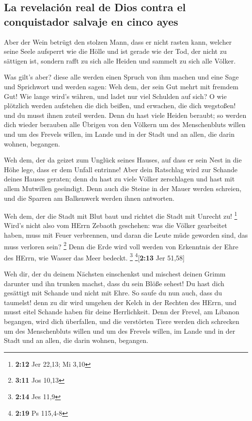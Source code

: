 \hypertarget{la-revelaciuxf3n-real-de-dios-contra-el-conquistador-salvaje-en-cinco-ayes}{%
\subsection{La revelación real de Dios contra el conquistador salvaje en
cinco
ayes}\label{la-revelaciuxf3n-real-de-dios-contra-el-conquistador-salvaje-en-cinco-ayes}}

 Aber der Wein betrügt den stolzen Mann, dass er nicht
rasten kann, welcher seine Seele aufsperrt wie die Hölle und ist gerade
wie der Tod, der nicht zu sättigen ist, sondern rafft zu sich alle
Heiden und sammelt zu sich alle Völker.

 Was gilt's aber? diese alle werden einen Spruch von ihm
machen und eine Sage und Sprichwort und werden sagen: Weh dem, der sein
Gut mehrt mit fremdem Gut! Wie lange wird's währen, und ladet nur viel
Schulden auf sich?  O wie plötzlich werden aufstehen die
dich beißen, und erwachen, die dich wegstoßen! und du musst ihnen zuteil
werden.  Denn du hast viele Heiden beraubt; so werden dich
wieder berauben alle Übrigen von den Völkern um des Menschenbluts willen
und um des Frevels willen, im Lande und in der Stadt und an allen, die
darin wohnen, begangen.

 Weh dem, der da geizet zum Unglück seines Hauses, auf
dass er sein Nest in die Höhe lege, dass er dem Unfall entrinne!
 Aber dein Ratschlag wird zur Schande deines Hauses
geraten; denn du hast zu viele Völker zerschlagen und hast mit allem
Mutwillen gesündigt.  Denn auch die Steine in der Mauer
werden schreien, und die Sparren am Balkenwerk werden ihnen antworten.

 Weh dem, der die Stadt mit Blut baut und richtet die
Stadt mit Unrecht zu! \footnote{\textbf{2:12} Jer 22,13; Mi 3,10}
 Wird's nicht also vom HErrn Zebaoth geschehen: was die
Völker gearbeitet haben, muss mit Feuer verbrennen, und daran die Leute
müde geworden sind, das muss verloren sein? \footnote{\textbf{3:11} Jos
  10,13}  Denn die Erde wird voll werden von Erkenntnis
der Ehre des HErrn, wie Wasser das Meer bedeckt. \footnote{\textbf{2:14}
  Jes 11,9} \footnote{\textbf{2:19} Ps 115,4-8}{[}\textbf{2:13} Jer
51,58{]}

 Weh dir, der du deinem Nächsten einschenkst und mischest
deinen Grimm darunter und ihn trunken machst, dass du sein Blöße sehest!
 Du hast dich gesättigt mit Schande und nicht mit Ehre.
So saufe du nun auch, dass du taumelst! denn zu dir wird umgehen der
Kelch in der Rechten des HErrn, und musst eitel Schande haben für deine
Herrlichkeit.  Denn der Frevel, am Libanon begangen, wird
dich überfallen, und die verstörten Tiere werden dich schrecken um des
Menschenbluts willen und um des Frevels willen, im Lande und in der
Stadt und an allen, die darin wohnen, begangen.

